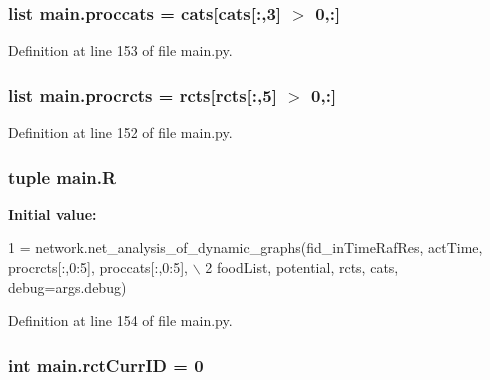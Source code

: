 \hypertarget{a00122_a4e3c4b627d098aef6c7905cb20683e07}{
\subsubsection[{proccats}]{\setlength{\rightskip}{0pt plus 5cm}list main.\-proccats = {\bf cats}\mbox{[}{\bf cats}\mbox{[}\-:,3\mbox{]} $>$ 0,\-:\mbox{]}}}\label{a00122_a4e3c4b627d098aef6c7905cb20683e07}


Definition at line 153 of file main.\-py.

\hypertarget{a00122_a2120e8355b3501aed0114a74091d56c1}{
\subsubsection[{procrcts}]{\setlength{\rightskip}{0pt plus 5cm}list main.\-procrcts = {\bf rcts}\mbox{[}{\bf rcts}\mbox{[}\-:,5\mbox{]} $>$ 0,\-:\mbox{]}}}\label{a00122_a2120e8355b3501aed0114a74091d56c1}


Definition at line 152 of file main.\-py.

\hypertarget{a00122_a8a594014e054956af345eaa5e16bea0d}{
\subsubsection[{R}]{\setlength{\rightskip}{0pt plus 5cm}tuple main.\-R}}\label{a00122_a8a594014e054956af345eaa5e16bea0d}
{\bfseries Initial value\-:}
\begin{DoxyCode}
1 = network.net\_analysis\_of\_dynamic\_graphs(fid\_inTimeRafRes, actTime, procrcts[:,0:5], proccats[:,0:5], \(\backslash\)
2                                                                                                                                                 
         foodList, potential, rcts, cats, debug=args.debug)
\end{DoxyCode}


Definition at line 154 of file main.\-py.

\hypertarget{a00122_a53e397dea15f17442a198395e65b377b}{
\subsubsection[{rct\-Curr\-I\-D}]{\setlength{\rightskip}{0pt plus 5cm}int main.\-rct\-Curr\-I\-D = 0}}\label{a00122_a53e397dea15f17442a198395e65b377b}


